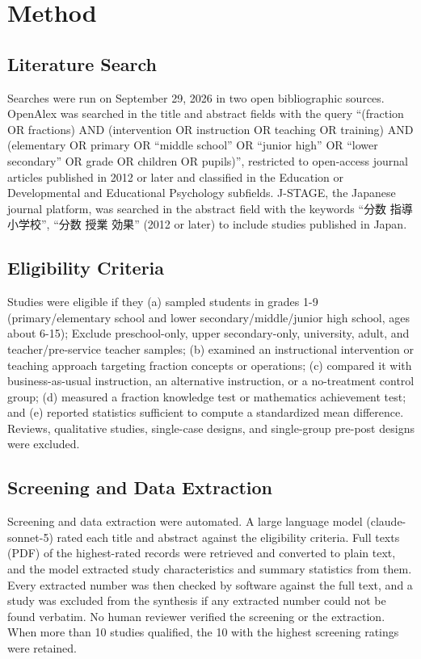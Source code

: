 \documentclass[man,a4paper,12pt,floatsintext,nolmodern,notab]{apa7}
\begin{document}
\section{Method}
\subsection{Literature Search}
Searches were run on September 29, 2026 in two open bibliographic sources. OpenAlex was searched in the title and abstract fields with the query “(fraction OR fractions) AND (intervention OR instruction OR teaching OR training) AND (elementary OR primary OR “middle school” OR “junior high” OR “lower secondary” OR grade OR children OR pupils)”, restricted to open-access journal articles published in 2012 or later and classified in the Education or Developmental and Educational Psychology subfields. J-STAGE, the Japanese journal platform, was searched in the abstract field with the keywords “{\cjkfont 分数} {\cjkfont 指導} {\cjkfont 小学校}”, “{\cjkfont 分数} {\cjkfont 授業} {\cjkfont 効果}” (2012 or later) to include studies published in Japan.

\subsection{Eligibility Criteria}
Studies were eligible if they (a) sampled students in grades 1-9 (primary/elementary school and lower secondary/middle/junior high school, ages about 6-15); Exclude preschool-only, upper secondary-only, university, adult, and teacher/pre-service teacher samples; (b) examined an instructional intervention or teaching approach targeting fraction concepts or operations; (c) compared it with business-as-usual instruction, an alternative instruction, or a no-treatment control group; (d) measured a fraction knowledge test or mathematics achievement test; and (e) reported statistics sufficient to compute a standardized mean difference. Reviews, qualitative studies, single-case designs, and single-group pre-post designs were excluded.

\subsection{Screening and Data Extraction}
Screening and data extraction were automated. A large language model (claude-sonnet-5) rated each title and abstract against the eligibility criteria. Full texts (PDF) of the highest-rated records were retrieved and converted to plain text, and the model extracted study characteristics and summary statistics from them. Every extracted number was then checked by software against the full text, and a study was excluded from the synthesis if any extracted number could not be found verbatim. No human reviewer verified the screening or the extraction. When more than 10 studies qualified, the 10 with the highest screening ratings were retained.
\end{document}
